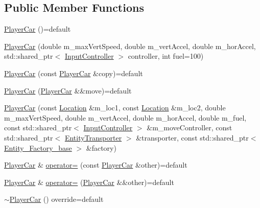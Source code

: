 \subsection*{Public Member Functions}
\begin{DoxyCompactItemize}
\item 
\hyperlink{classroadfighter_1_1PlayerCar_ada20f509f074df30613ecfe09e80c79e}{Player\+Car} ()=default
\item 
\hyperlink{classroadfighter_1_1PlayerCar_a0e4db8cf7fc38214fa0383e1518ab2a2}{Player\+Car} (double m\+\_\+max\+Vert\+Speed, double m\+\_\+vert\+Accel, double m\+\_\+hor\+Accel, std\+::shared\+\_\+ptr$<$ \hyperlink{classroadfighter_1_1InputController}{Input\+Controller} $>$ controller, int fuel=100)
\item 
\hyperlink{classroadfighter_1_1PlayerCar_a89f593714201e6d8252abd19125c7c88}{Player\+Car} (const \hyperlink{classroadfighter_1_1PlayerCar}{Player\+Car} \&copy)=default
\item 
\hyperlink{classroadfighter_1_1PlayerCar_a1243a4b2ec289c99884cb1c5f8a57531}{Player\+Car} (\hyperlink{classroadfighter_1_1PlayerCar}{Player\+Car} \&\&move)=default
\item 
\hyperlink{classroadfighter_1_1PlayerCar_a50481f68beb27eeb71c3ecb7ea5bf4a1}{Player\+Car} (const \hyperlink{classroadfighter_1_1Location}{Location} \&m\+\_\+loc1, const \hyperlink{classroadfighter_1_1Location}{Location} \&m\+\_\+loc2, double m\+\_\+max\+Vert\+Speed, double m\+\_\+vert\+Accel, double m\+\_\+hor\+Accel, double m\+\_\+fuel, const std\+::shared\+\_\+ptr$<$ \hyperlink{classroadfighter_1_1InputController}{Input\+Controller} $>$ \&m\+\_\+move\+Controller, const std\+::shared\+\_\+ptr$<$ \hyperlink{classroadfighter_1_1EntityTransporter}{Entity\+Transporter} $>$ \&transporter, const std\+::shared\+\_\+ptr$<$ \hyperlink{classroadfighter_1_1Entity__Factory__base}{Entity\+\_\+\+Factory\+\_\+base} $>$ \&factory)
\item 
\hyperlink{classroadfighter_1_1PlayerCar}{Player\+Car} \& \hyperlink{classroadfighter_1_1PlayerCar_a1913e3231449aa67ad450ac15267086b}{operator=} (const \hyperlink{classroadfighter_1_1PlayerCar}{Player\+Car} \&other)=default
\item 
\hyperlink{classroadfighter_1_1PlayerCar}{Player\+Car} \& \hyperlink{classroadfighter_1_1PlayerCar_aa6938d2531fea4938eb0837fb2763304}{operator=} (\hyperlink{classroadfighter_1_1PlayerCar}{Player\+Car} \&\&other)=default
\item 
\hyperlink{classroadfighter_1_1PlayerCar_a7da4510fe32e4380f7a5771849ac082c}{$\sim$\+Player\+Car} () override=default

\end{DoxyCompactItemize}

